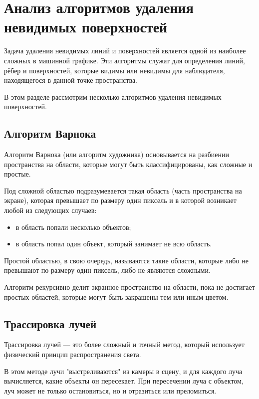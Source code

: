 \section{Анализ алгоритмов удаления невидимых поверхностей}

Задача удаления невидимых линий и поверхностей является одной из наиболее сложных в машинной графике. Эти алгоритмы служат для определения линий, рёбер и поверхностей, которые видимы или невидимы для наблюдателя, находящегося в данной точке пространства.~\cite{Rogers}

В этом разделе рассмотрим несколько алгоритмов удаления невидимых поверхностей.

\subsection{Алгоритм Варнока}

Алгоритм Варнока (или алгоритм художника) основывается на разбиении пространства на области, которые могут быть классифицированы, как сложные и простые.

Под сложной областью подразумевается такая область (часть пространства на экране), которая превышает по размеру один пиксель и в которой возникает любой из следующих случаев:
\begin{itemize}
    \item в область попали несколько объектов;
    \item в область попал один объект, который занимает не всю область.
\end{itemize}

Простой областью, в свою очередь, называются такие области, которые либо не превышают по размеру один пиксель, либо не являются сложными.

Алгоритм рекурсивно делит экранное пространство на области, пока не достигает простых областей, которые могут быть закрашены тем или иным цветом.

\subsection{Трассировка лучей}

Трассировка лучей --- это более сложный и точный метод, который использует физический принцип распространения света. 

В этом методе лучи "выстреливаются" из камеры в сцену, и для каждого луча вычисляется, какие объекты он пересекает. При пересечении луча с объектом, луч может не только остановиться, но и отразиться или преломиться. 

